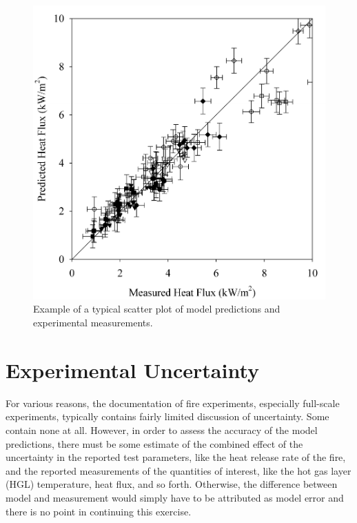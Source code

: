 \begin{figure}[t]
\begin{center}
\includegraphics[height=3.in]{FIGURES/scatterplot}
\end{center}
\caption[Sample scatter plot.]{Example of a typical scatter plot of model predictions and experimental measurements.}
\label{scatterplot}
\end{figure}





\section{Experimental Uncertainty}

For various reasons, the documentation of fire experiments, especially full-scale experiments,
typically contains fairly limited discussion of uncertainty. Some contain none at all.
However, in order to assess the accuracy of the model predictions, there must be some estimate of the
combined effect of the uncertainty in the reported test parameters, like the heat release rate of the fire,
and the reported measurements of the quantities of interest, like the hot gas layer (HGL)
temperature, heat flux, and so forth. Otherwise, the difference between model and measurement would simply have to be attributed as model error and there is no point in
continuing this exercise.

